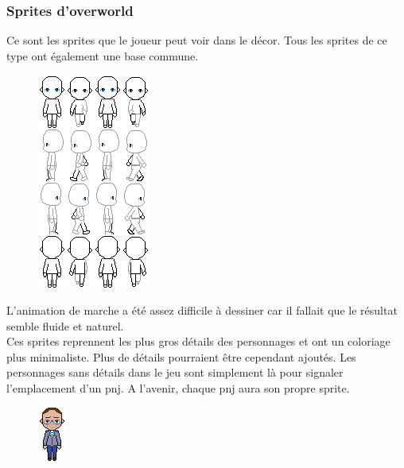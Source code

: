 \documentclass[11pt]{article}
\begin{document}
\subsubsection{Sprites d'overworld}
Ce sont les sprites que le joueur peut voir dans le décor. Tous les sprites de ce type ont également une base commune.
\begin{figure}[H]
\includegraphics[scale=1]{animationBase}
\centering
\end{figure}
L'animation de marche a été assez difficile à dessiner car il fallait que le résultat semble fluide et naturel.\\

Ces sprites reprennent les plus gros détails des personnages et ont un coloriage plus minimaliste. Plus de détails pourraient être cependant ajoutés. Les personnages sans détails dans le jeu sont simplement là pour signaler l'emplacement d'un pnj. A l'avenir, chaque pnj aura son propre sprite.
\begin{figure}[H]
\includegraphics[scale=1.5]{panglossSprite}
\centering
\end{figure}
\end{document}
